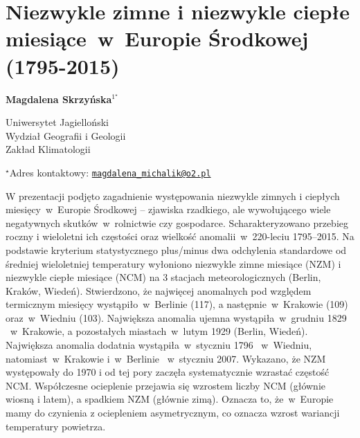\documentclass[\main/boa.tex]{subfiles}
\begin{document}
\section{Niezwykle zimne i niezwykle ciepłe miesiące~w~Europie Środkowej \mbox{(1795-2015)}}

\begin{center}
  {\bf {} Magdalena Skrzyńska$^{1^\star}$}
\end{center}

\vskip 0.3cm

\begin{affiliations}
\begin{enumerate}
\begin{minipage}{0.915\textwidth}
\centering
\item Uniwersytet Jagielloński\\ Wydział Geografii i Geologii\\ Zakład Klimatologii\\[-2pt]
\end{minipage}
\end{enumerate}
$^\star$Adres kontaktowy: \href{mailto:magdalena_michalik@o2.pl}{\nolinkurl{magdalena_michalik@o2.pl}}\\
\end{affiliations}

\vskip 0.5cm


\vskip 0.5cm

W prezentacji podjęto zagadnienie występowania niezwykle zimnych i ciepłych miesięcy~w~Europie Środkowej -- zjawiska rzadkiego, ale wywołującego wiele negatywnych skutków~w~rolnictwie czy gospodarce. Scharakteryzowano przebieg roczny i wieloletni ich częstości oraz wielkość anomalii~w~220-leciu \mbox{1795--2015}.  Na podstawie kryterium statystycznego plus/minus dwa odchylenia standardowe od średniej wieloletniej temperatury wyłoniono niezwykle zimne miesiące (NZM) i niezwykle ciepłe miesiące (NCM) na 3 stacjach meteorologicznych (Berlin, Kraków, Wiedeń). Stwierdzono, że najwięcej anomalnych pod względem termicznym miesięcy wystąpiło~w~Berlinie (117), a następnie~w~Krakowie (109) oraz~w~Wiedniu (103).  Największa anomalia ujemna wystąpiła~w~grudniu 1829 ~w~Krakowie, a pozostałych miastach~w~lutym 1929 (Berlin, Wiedeń). Największa anomalia dodatnia wystąpiła~w~styczniu 1796 ~w~Wiedniu, natomiast~w~Krakowie i~w~Berlinie ~w~styczniu 2007. Wykazano, że NZM występowały do 1970 i od tej pory zaczęła systematycznie wzrastać częstość NCM. Współczesne ocieplenie przejawia się wzrostem liczby NCM (głównie wiosną i latem), a spadkiem NZM (głównie zimą). Oznacza to, że~w~Europie mamy do czynienia z ociepleniem asymetrycznym, co oznacza wzrost wariancji temperatury powietrza. 
\end{document}

